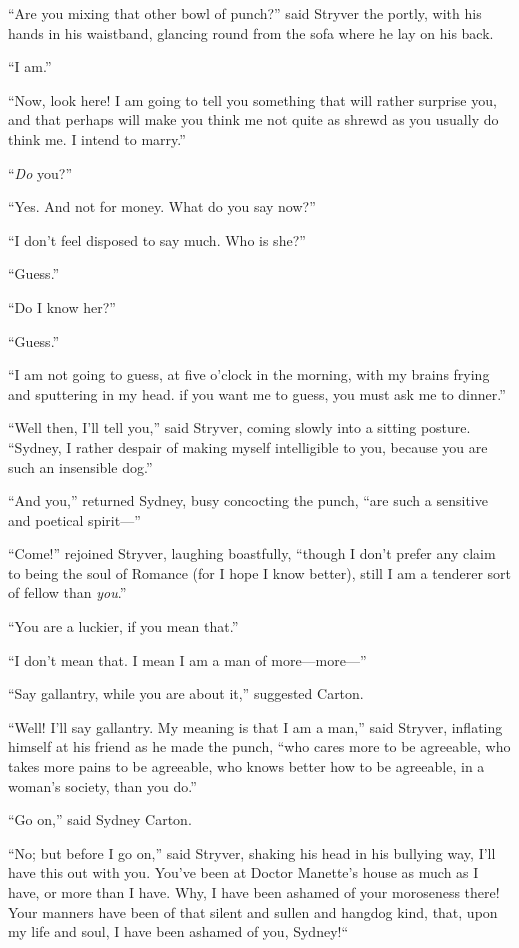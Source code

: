 ``Are you mixing that other bowl of punch?'' said Stryver the portly,
with his hands in his waistband, glancing round from the sofa where
he lay on his back.

``I am.''

``Now, look here!  I am going to tell you something that will rather
surprise you, and that perhaps will make you think me not quite as
shrewd as you usually do think me.  I intend to marry.''

``\emph{Do} you?''

``Yes.  And not for money.  What do you say now?''

``I don't feel disposed to say much.  Who is she?''

``Guess.''

``Do I know her?''

``Guess.''

``I am not going to guess, at five o'clock in the morning, with my
brains frying and sputtering in my head. if you want me to guess, you
must ask me to dinner.''

``Well then, I'll tell you,'' said Stryver, coming slowly into a sitting
posture.  ``Sydney, I rather despair of making myself intelligible to you,
because you are such an insensible dog.''

``And you,'' returned Sydney, busy concocting the punch, ``are such a
sensitive and poetical spirit---''

``Come!'' rejoined Stryver, laughing boastfully, ``though I don't prefer
any claim to being the soul of Romance (for I hope I know better),
still I am a tenderer sort of fellow than \emph{you}.''

``You are a luckier, if you mean that.''

``I don't mean that.  I mean I am a man of more---more---''

``Say gallantry, while you are about it,'' suggested Carton.

``Well!  I'll say gallantry.  My meaning is that I am a man,'' said
Stryver, inflating himself at his friend as he made the punch,
``who cares more to be agreeable, who takes more pains to be agreeable,
who knows better how to be agreeable, in a woman's society, than you do.''

``Go on,'' said Sydney Carton.

``No; but before I go on,'' said Stryver, shaking his head in his bullying
way, I'll have this out with you.  You've been at Doctor Manette's
house as much as I have, or more than I have.  Why, I have been ashamed
of your moroseness there!  Your manners have been of that silent and
sullen and hangdog kind, that, upon my life and soul, I have been
ashamed of you, Sydney!``

